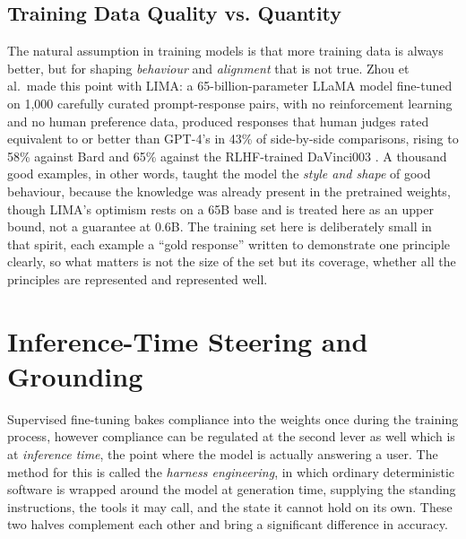\subsection{Training Data Quality vs. Quantity}
\label{subsec:training-data-quality-vs-quantity}

The natural assumption in training models is that more training data is always better, but for shaping \emph{behaviour} and \emph{alignment} that is not true. Zhou et al.\ made this point with LIMA: a 65-billion-parameter LLaMA model fine-tuned on 1,000 carefully curated prompt-response pairs, with no reinforcement learning and no human preference data, produced responses that human judges rated equivalent to or better than GPT-4's in 43\% of side-by-side comparisons, rising to 58\% against Bard and 65\% against the RLHF-trained DaVinci003 \cite{zhou2023limaalignment}. A thousand good examples, in other words, taught the model the \emph{style and shape} of good behaviour, because the knowledge was already present in the pretrained weights, though LIMA's optimism rests on a 65B base and is treated here as an upper bound, not a guarantee at 0.6B. The training set here is deliberately small in that spirit, each example a ``gold response'' written to demonstrate one principle clearly, so what matters is not the size of the set but its coverage, whether all the principles are represented and represented well.

\section{Inference-Time Steering and Grounding}
\label{sec:inference-time-steering}

Supervised fine-tuning bakes compliance into the weights once during the training process, however compliance can be regulated at the second lever as well which is at \emph{inference time}, the point where the model is actually answering a user. The method for this is called the \emph{harness engineering}, in which ordinary deterministic software is wrapped around the model at generation time, supplying the standing instructions, the tools it may call, and the state it cannot hold on its own. These two halves complement each other and bring a significant difference in accuracy.

